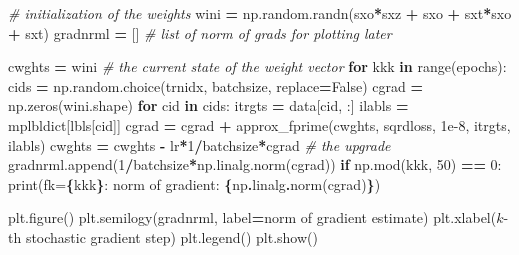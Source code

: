 \documentclass[
]{book}
\newenvironment{Shaded}{\begin{snugshade}}{\end{snugshade}}
\newcommand{\BuiltInTok}[1]{#1}
\newcommand{\CommentTok}[1]{\textcolor[rgb]{0.56,0.35,0.01}{\textit{#1}}}
\newcommand{\ControlFlowTok}[1]{\textcolor[rgb]{0.13,0.29,0.53}{\textbf{#1}}}
\newcommand{\DecValTok}[1]{\textcolor[rgb]{0.00,0.00,0.81}{#1}}
\newcommand{\FloatTok}[1]{\textcolor[rgb]{0.00,0.00,0.81}{#1}}
\newcommand{\KeywordTok}[1]{\textcolor[rgb]{0.13,0.29,0.53}{\textbf{#1}}}
\newcommand{\NormalTok}[1]{#1}
\newcommand{\OperatorTok}[1]{\textcolor[rgb]{0.81,0.36,0.00}{\textbf{#1}}}
\newcommand{\SpecialCharTok}[1]{\textcolor[rgb]{0.81,0.36,0.00}{\textbf{#1}}}
\newcommand{\SpecialStringTok}[1]{\textcolor[rgb]{0.31,0.60,0.02}{#1}}
\newcommand{\StringTok}[1]{\textcolor[rgb]{0.31,0.60,0.02}{#1}}
\newcommand{\VariableTok}[1]{\textcolor[rgb]{0.00,0.00,0.00}{#1}}
\theoremstyle{definition}
\theoremstyle{definition}
\theoremstyle{definition}
\theoremstyle{definition}
\theoremstyle{remark}
\begin{document}
\begin{Shaded}
\begin{Highlighting}[]
\CommentTok{\# initialization of the weights}
\NormalTok{wini }\OperatorTok{=}\NormalTok{ np.random.randn(sxo}\OperatorTok{*}\NormalTok{sxz }\OperatorTok{+}\NormalTok{ sxo }\OperatorTok{+}\NormalTok{ sxt}\OperatorTok{*}\NormalTok{sxo }\OperatorTok{+}\NormalTok{ sxt)}
\NormalTok{gradnrml }\OperatorTok{=}\NormalTok{ []  }\CommentTok{\# list of norm of grads for plotting later}

\NormalTok{cwghts }\OperatorTok{=}\NormalTok{ wini  }\CommentTok{\# the current state of the weight vector}
\ControlFlowTok{for}\NormalTok{ kkk }\KeywordTok{in} \BuiltInTok{range}\NormalTok{(epochs):}
\NormalTok{    cids }\OperatorTok{=}\NormalTok{ np.random.choice(trnidx, batchsize, replace}\OperatorTok{=}\VariableTok{False}\NormalTok{)}
\NormalTok{    cgrad }\OperatorTok{=}\NormalTok{ np.zeros(wini.shape)}
    \ControlFlowTok{for}\NormalTok{ cid }\KeywordTok{in}\NormalTok{ cids:}
\NormalTok{        itrgts }\OperatorTok{=}\NormalTok{ data[cid, :]}
\NormalTok{        ilabls }\OperatorTok{=}\NormalTok{ mplbldict[lbls[cid]]}
\NormalTok{        cgrad }\OperatorTok{=}\NormalTok{ cgrad }\OperatorTok{+}\NormalTok{ approx\_fprime(cwghts, sqrdloss, }\FloatTok{1e{-}8}\NormalTok{,}
\NormalTok{                                      itrgts, ilabls)}
\NormalTok{    cwghts }\OperatorTok{=}\NormalTok{ cwghts }\OperatorTok{{-}}\NormalTok{ lr}\OperatorTok{*}\DecValTok{1}\OperatorTok{/}\NormalTok{batchsize}\OperatorTok{*}\NormalTok{cgrad  }\CommentTok{\# the upgrade}
\NormalTok{    gradnrml.append(}\DecValTok{1}\OperatorTok{/}\NormalTok{batchsize}\OperatorTok{*}\NormalTok{np.linalg.norm(cgrad))}
    \ControlFlowTok{if}\NormalTok{ np.mod(kkk, }\DecValTok{50}\NormalTok{) }\OperatorTok{==} \DecValTok{0}\NormalTok{:}
        \BuiltInTok{print}\NormalTok{(}\SpecialStringTok{f\textquotesingle{}k=}\SpecialCharTok{\{}\NormalTok{kkk}\SpecialCharTok{\}}\SpecialStringTok{: norm of gradient: }\SpecialCharTok{\{}\NormalTok{np}\SpecialCharTok{.}\NormalTok{linalg}\SpecialCharTok{.}\NormalTok{norm(cgrad)}\SpecialCharTok{\}}\SpecialStringTok{\textquotesingle{}}\NormalTok{)}
\end{Highlighting}
\end{Shaded}

\begin{Shaded}
\begin{Highlighting}[]
\NormalTok{plt.figure()}
\NormalTok{plt.semilogy(gradnrml, label}\OperatorTok{=}\StringTok{\textquotesingle{}norm of gradient estimate\textquotesingle{}}\NormalTok{)}
\NormalTok{plt.xlabel(}\StringTok{\textquotesingle{}$k${-}th stochastic gradient step\textquotesingle{}}\NormalTok{)}
\NormalTok{plt.legend()}
\NormalTok{plt.show()}
\end{Highlighting}
\end{Shaded}
\end{document}
